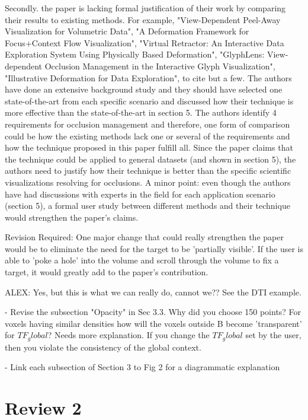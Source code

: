 \documentclass[a4paper,10pt]{article}
\begin{document}
    Secondly. the paper is lacking formal justification of their work by comparing
    their results to existing methods. For example, "View-Dependent Peel-Away
    Visualization for Volumetric Data", "A Deformation Framework for Focus+Context
    Flow Visualization", "Virtual Retractor: An Interactive Data Exploration System
    Using Physically Based Deformation", "GlyphLens: View-dependent Occlusion
    Management in the Interactive Glyph Visualization", "Illustrative Deformation for
    Data Exploration", to cite but a few. The authors have done an extensive
    background study and they should have selected one state-of-the-art from each
    specific scenario and discussed how their technique is more effective than the
    state-of-the-art in section 5. The authors identify 4 requirements for occlusion
    management and therefore, one form of comparison could be how the existing methods
    lack one or several of the requirements and how the technique proposed in this
    paper fulfill all. Since the paper claims that the technique could be applied to
    general datasets (and shown in section 5), the authors need to justify how their
    technique is better than the specific scientific visualizations resolving for
    occlusions.
    A minor point: even though the authors have had discussions with experts in the
    field for each application scenario (section 5), a formal user study between
    different methods and their technique would strengthen the paper's claims.

    Revision Required:
    One major change that could really strengthen the paper would be to eliminate the
    need for the target to be 'partially visible'. If the user is able to 'poke a
    hole' into the volume and scroll through the volume to fix a target, it would
    greatly add to the paper's contribution.
    
    ALEX: Yes, but this is what we can really do, cannot we?? See the DTI example.

    - Revise the subsection "Opacity" in Sec 3.3. Why did you choose 150 points? For
    voxels having similar densities how will the voxels outside B become 'transparent'
    for $TF_global$? Needs more explanation. If you change the $TF_global$ set by the
    user, then you violate the consistency of the global context.

    - Link each subsection of Section 3 to Fig 2 for a diagrammatic explanation

\section{Review 2}
\end{document}
